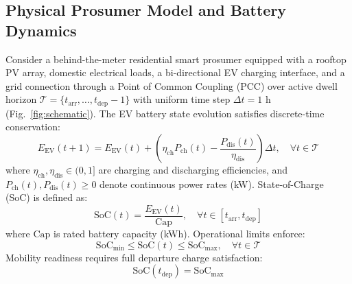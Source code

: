 \documentclass[journal]{IEEEtran}
\theoremstyle{remark}
\begin{document}
\subsection{Physical Prosumer Model and Battery Dynamics}
Consider a behind-the-meter residential smart prosumer equipped with a rooftop PV array, domestic electrical loads, a bi-directional EV charging interface, and a grid connection through a Point of Common Coupling (PCC) over active dwell horizon $\mathcal{T} = \{t_{\mathrm{arr}}, \dots, t_{\mathrm{dep}}-1\}$ with uniform time step $\Delta t = 1\text{ h}$ (Fig.~\ref{fig:schematic}). The EV battery state evolution satisfies discrete-time conservation:
\begin{equation}
E_{\mathrm{EV}}(t+1) = E_{\mathrm{EV}}(t) + \left(\eta_{\mathrm{ch}} P_{\mathrm{ch}}(t) - \frac{P_{\mathrm{dis}}(t)}{\eta_{\mathrm{dis}}}\right) \Delta t, \quad \forall t \in \mathcal{T}
\label{eq:battery_dynamics}
\end{equation}
where $\eta_{\mathrm{ch}}, \eta_{\mathrm{dis}} \in (0, 1]$ are charging and discharging efficiencies, and $P_{\mathrm{ch}}(t), P_{\mathrm{dis}}(t) \ge 0$ denote continuous power rates (kW). State-of-Charge (SoC) is defined as:
\begin{equation}
\mathrm{SoC}(t) = \frac{E_{\mathrm{EV}}(t)}{\mathrm{Cap}}, \quad \forall t \in [t_{\mathrm{arr}}, t_{\mathrm{dep}}]
\label{eq:soc_def}
\end{equation}
where $\mathrm{Cap}$ is rated battery capacity (kWh). Operational limits enforce:
\begin{equation}
\mathrm{SoC}_{\min} \le \mathrm{SoC}(t) \le \mathrm{SoC}_{\max}, \quad \forall t \in \mathcal{T}
\label{eq:soc_bounds}
\end{equation}
Mobility readiness requires full departure charge satisfaction:
\begin{equation}
\mathrm{SoC}(t_{\mathrm{dep}}) = \mathrm{SoC}_{\max}
\label{eq:departure_soc}
\end{equation}
\end{document}
